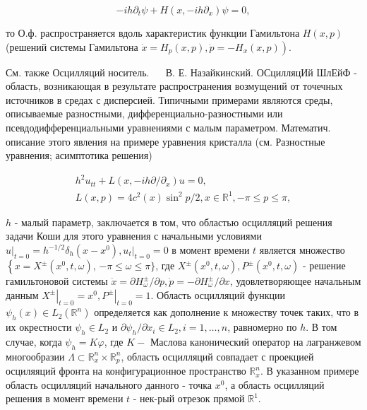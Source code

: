 \documentclass[10pt]{article}
\begin{document}
\[

-i h \partial_{t} \psi+H\left(x,-i h \partial_{x}\right) \psi=0,

\]



то О.ф. распространяется вдоль характеристик функции Гамильтона $H(x, p)$ (решений системы Гамильтона $\left.\dot{x}=H_{p}(x, p), \dot{p}=-H_{x}(x, p)\right)$.



См. также Осцилляций носитель. $\quad$ В. Е. Назайкинский. ОСцилляцИй ШлЕйФ - область, возникающая в результате распространения возмущений от точечных источников в средах с дисперсией. Типичными примерами являются среды, описываемые разностными, дифференциально-разностными или псевдодифференциальными уравнениями с малым параметром. Математич. описание этого явления на примере уравнения кристалла (см. Разностные уравнения; асимптотика решения)



\[

\begin{gathered}

h^{2} u_{t t}+L\left(x,-i h \partial / \partial_{x}\right) u=0, \\

L(x, p)=4 c^{2}(x) \sin ^{2} p / 2, x \in \mathbb{R}^{1},-\pi \leqslant p \leqslant \pi,

\end{gathered}

\]



$h$ - малый параметр, заключается в том, что областью осцилляций решения задачи Коши для этого уравнения с начальными условиями $\left.u\right|_{t=0}=h^{-1 / 2} \delta_{h}\left(x-x^{0}\right),\left.u_{t}\right|_{t=0}=0$ в момент времени $t$ является множество $\left\{x=X^{ \pm}\left(x^{0}, t, \omega\right)\right.$, $-\pi \leqslant \omega \leqslant \pi\}$, где $X^{ \pm}\left(x^{0}, t, \omega\right), P^{ \pm}\left(x^{0}, t, \omega\right)$ - решение гамильтоновой системы $\dot{x}=\partial H_{\omega}^{ \pm} / \partial p, \dot{p}=-\partial H_{\omega}^{ \pm} / \partial x$, удовлетворяющее начальным данным $\left.X^{ \pm}\right|_{t=0}=x^{0},\left.P^{ \pm}\right|_{t=0}=1$. Область осцилляций функции $\psi_{h}(x) \in L_{2}\left(\mathbb{R}^{n}\right)$ определяется как дополнение к множеству точек таких, что в их окрестности $\psi_{h} \in L_{2}$ и $\partial \psi_{h} / \partial x_{i} \in L_{2}, i=1, \ldots, n$, равномерно по $h$. В том случае, когда $\psi_{h}=K \varphi$, где $K-$ Маслова канонический оператор на лагранжевом многообразии $\Lambda \subset \mathbb{R}_{x}^{n} \times \mathbb{R}_{p}^{n}$, область осцилляций совпадает с проекцией осциляяций фронта на конфигурационное пространство $\mathbb{R}_{x}^{n}$. В указанном примере область осцилляций начального данного - точка $x^{0}$, а область осцилляций решения в момент времени $t$ - нек-рый отрезок прямой $\mathbb{R}^{1}$.
\end{document}
